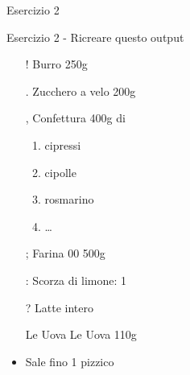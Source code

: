 \begin{frame}{Esercizio 2}

\begin{block}{Esercizio 2 - Ricreare questo output}
 \begin{itemize}
 \item[!] Burro 250g
 \item[.] Zucchero a velo 200g
 \item[,] Confettura 400g di
 \begin{enumerate}
  \item cipressi
  \item cipolle
  \item rosmarino
  \item \dots
 \end{enumerate}

 \item[;] Farina 00 500g
 \item[:] Scorza di limone: 1
 \item[?] Latte intero
 \item[Le Uova] Le Uova 110g
 \item Sale fino 1 pizzico
\end{itemize}
\end{block}

\end{frame}